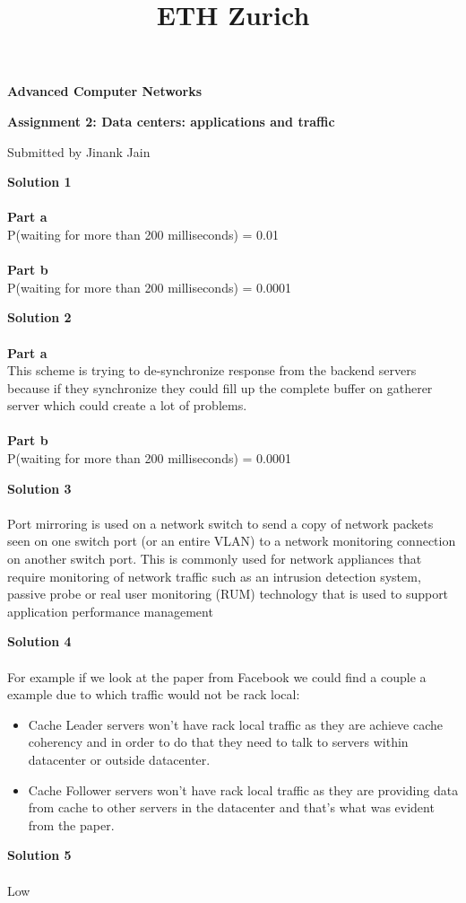 \documentclass[letterpaper, 11pt]{article}
\title{ETH Zurich}
\begin{document}

\begin{center}
\Large \bf Advanced Computer Networks

\Large \bf Assignment 2: Data centers: applications and traffic

\large Submitted by Jinank Jain
\end{center}

\textbf{Solution 1}\\ \\
\textbf{Part a} \\
P(waiting for more than 200 milliseconds) = 0.01 \\ \\
\textbf{Part b} \\
P(waiting for more than 200 milliseconds) = 0.0001
\bigskip

\textbf{Solution 2}\\ \\
\textbf{Part a} \\
This scheme is trying to de-synchronize response from the backend servers because if they synchronize they could fill up the complete buffer on gatherer server which could create a lot of problems. \\ \\
\textbf{Part b} \\
P(waiting for more than 200 milliseconds) = 0.0001
\bigskip

\textbf{Solution 3}\\ \\
Port mirroring is used on a network switch to send a copy of network packets seen on one switch port (or an entire VLAN) to a network monitoring connection on another switch port. This is commonly used for network appliances that require monitoring of network traffic such as an intrusion detection system, passive probe or real user monitoring (RUM) technology that is used to support application performance management 
\bigskip

\textbf{Solution 4}\\ \\
For example if we look at the paper from Facebook we could find a couple a example due to which traffic would not be rack local:
\begin{itemize}
\item Cache Leader servers won't have rack local traffic as they are achieve cache coherency and in order to do that they need to talk to servers within datacenter or outside datacenter.
\item Cache Follower servers won't have rack local traffic as they are providing data from cache to other servers in the datacenter and that's what was evident from the paper.
\end{itemize}
\bigskip


\textbf{Solution 5}\\ \\
Low
\bigskip

\clearpage

\end{document}

